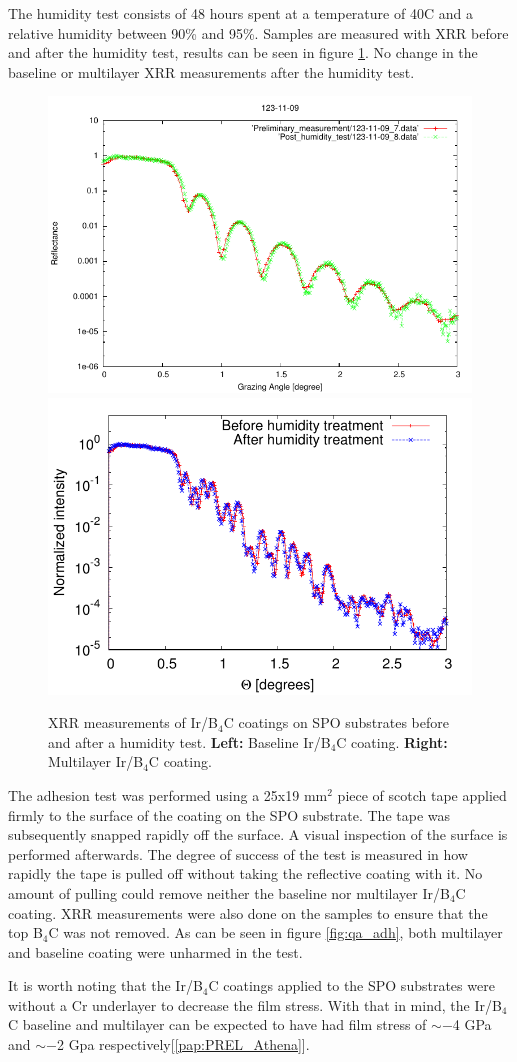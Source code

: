 The humidity test consists of 48 hours spent at a temperature of 40\degr C and a relative humidity between 90\% and 95\%. Samples are measured with XRR before and after the humidity test, results can be seen in figure \ref{fig:qa_hum}. No change in the baseline or multilayer XRR measurements after the humidity test.

\begin{figure}[!h]
  \center  \includegraphics[width=0.47\linewidth]{figures/athena/coating_on_spo/123-11-09_Post_Humidity_test.pdf}
  \includegraphics[width=0.47\linewidth]{figures/athena/coating_on_spo/120-09-26_hum_2.pdf}
\caption{\footnotesize XRR measurements of Ir/B$_4$C coatings on SPO substrates before and after a humidity test. \textbf{Left:} Baseline Ir/B$_4$C coating. \textbf{Right:} Multilayer Ir/B$_4$C coating.}\label{fig:qa_hum}
\end{figure}

The adhesion test was performed using a 25x19 mm$^2$ piece of scotch tape applied firmly to the surface of the coating on the SPO substrate. The tape was subsequently snapped rapidly off the surface. A visual inspection of the surface is performed afterwards. The degree of success of the test is measured in how rapidly the tape is pulled off without taking the reflective coating with it. No amount of pulling could remove neither the baseline nor multilayer Ir/B$_4$C coating. XRR measurements were also done on the samples to ensure that the top B$_4$C was not removed. As can be seen in figure \ref{fig:qa_adh}, both multilayer and baseline coating were unharmed in the test.

It is worth noting that the Ir/B$_4$C coatings applied to the SPO substrates were without a Cr underlayer to decrease the film stress. With that in mind, the Ir/B$_4$C baseline and multilayer can be expected to have had film stress of $\sim-$4 GPa and $\sim-$2 Gpa respectively[\ref{pap:PREL_Athena}].

